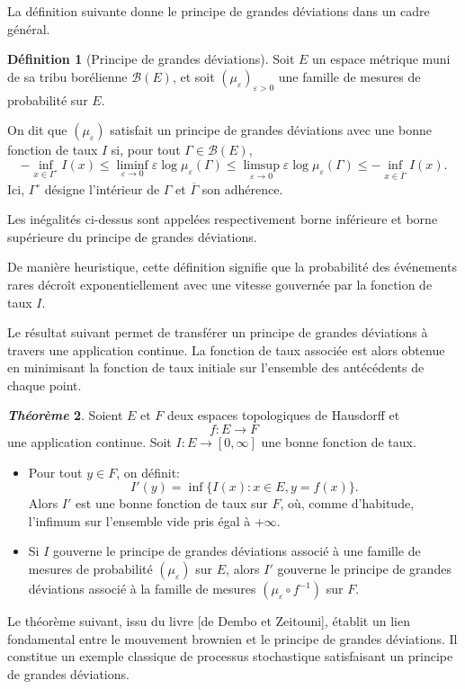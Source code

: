 \documentclass[12pt,a4paper,twoside]{book}%
\theoremstyle{definition}
\newtheorem{dfn}{Définition}[section]
\newtheorem{thm}[dfn]{\textit{Théorème}}
\numberwithin{equation}{section}
\begin{document}
La définition suivante donne le principe de grandes déviations dans un cadre général.
\begin{dfn}[Principe de grandes déviations]
	Soit $E$ un espace métrique muni de sa tribu borélienne $\mathcal{B}(E)$, et soit $(\mu_\varepsilon)_{\varepsilon>0}$ une famille de mesures de probabilité sur $E$.
	
	On dit que $(\mu_\varepsilon)$ satisfait un principe de grandes déviations avec une bonne fonction de taux $I$ si, pour tout $\Gamma \in \mathcal{B}(E)$,
	\[
	-\inf_{x \in \Gamma^\circ} I(x) 
	\le \liminf_{\varepsilon \to 0} \varepsilon \log \mu_\varepsilon(\Gamma) 
	\le \limsup_{\varepsilon \to 0} \varepsilon \log \mu_\varepsilon(\Gamma) 
	\le -\inf_{x \in \overline{\Gamma}} I(x).
	\]
	Ici, $\Gamma^\circ$ désigne l'intérieur de $\Gamma$ et $\overline{\Gamma}$ son adhérence.
\end{dfn}
Les inégalités ci-dessus sont appelées respectivement borne inférieure et borne supérieure du principe de grandes déviations.

De manière heuristique, cette définition signifie que la probabilité des événements rares décroît exponentiellement avec une vitesse gouvernée par la fonction de taux $I$.

Le résultat suivant permet de transférer un principe de grandes déviations à travers une application continue. La fonction de taux associée est alors obtenue en minimisant la fonction de taux initiale sur l’ensemble des antécédents de chaque point.

\begin{thm}
	Soient $E$ et $F$ deux espaces topologiques de Hausdorff et 
	\[
	f: E\longrightarrow F
	\] une application continue.
	Soit $I:E\longrightarrow [0,\infty]$ une bonne fonction de taux.
	\begin{itemize}
		\item[(a)] Pour tout $y\in F$, on définit:
		\[
		I'(y)=\inf\{I(x):x\in E,y=f(x)\}.
		\]
		Alors $I'$ est une bonne fonction de taux sur $F$, où, comme d'habitude, l'infimum sur l'ensemble vide pris égal à +$\infty$.
		\item[(b)] Si $I$ gouverne le principe de grandes déviations associé à une famille de mesures de probabilité $(\mu_\varepsilon)$ sur $E$, alors $I'$ gouverne le principe de grandes déviations associé à la famille de mesures $(\mu_\varepsilon\circ f^{-1})$ sur $F$.
	\end{itemize}
\end{thm}
Le théorème suivant, issu du livre [de Dembo et Zeitouni], établit un lien fondamental entre le mouvement brownien et le principe de grandes déviations. Il constitue un exemple classique de processus stochastique satisfaisant un principe de grandes déviations.
\end{document}
